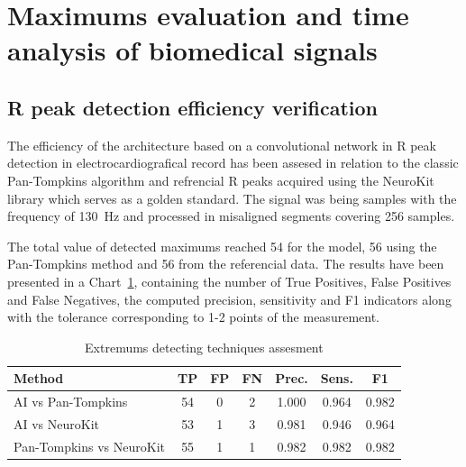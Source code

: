 \documentclass[journal]{IEEEtran}
\begin{document}
{%
\newpage
\section{Maximums evaluation and time analysis of biomedical signals}
\subsection{R peak detection efficiency verification}
The efficiency of the architecture based on a convolutional network in R peak detection in electrocardiografical record has been assesed in relation to the classic Pan-Tompkins algorithm and refrencial R peaks acquired using the NeuroKit library which serves as a golden standard. The signal was being samples with the frequency of 130 Hz and processed in misaligned segments covering 256 samples.

The total value of detected maximums reached 54 for the model, 56 using the Pan-Tompkins method and 56 from the referencial data. The results have been presented in a Chart~\ref{tab:peak_comparison}, containing the number of True Positives, False Positives and False Negatives, the computed precision, sensitivity and F1 indicators along with the tolerance corresponding to 1-2 points of the measurement.

\begin{table}[ht]
\caption{Extremums detecting techniques assesment}
\label{tab:peak_comparison}
\centering
\begin{tabular}{|p{3.08cm}|c|c|c|c|c|c|}
\hline
\textbf{Method} & \textbf{TP} & \textbf{FP} & \textbf{FN} & \textbf{Prec.} & \textbf{Sens.} & \textbf{F1} \\
\hline
AI vs Pan-Tompkins & 54 & 0 & 2 & 1.000 & 0.964 & 0.982 \\
AI vs NeuroKit & 53 & 1 & 3 & 0.981 & 0.946 & 0.964 \\
Pan-Tompkins vs NeuroKit & 55 & 1 & 1 & 0.982 & 0.982 & 0.982 \\
\hline
\end{tabular}
\end{table}

}
\end{document}
